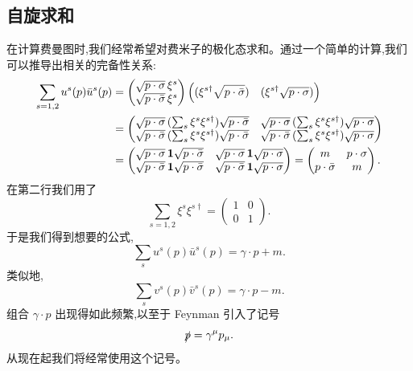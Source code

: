 \subsection{自旋求和}

在计算费曼图时,我们经常希望对费米子的极化态求和。通过一个简单的计算,我们可以推导出相关的完备性关系:
\begin{align}
  \sum_{s=1,2} u^s(p)\bar{u}^s(p) &=
    \begin{pmatrix}
      \sqrt{p\cdot\sigma}\,\xi^s\\
      \sqrt{p\cdot\bar{\sigma}}\,\xi^s
    \end{pmatrix}
    \Bigl( (\xi^{s\dagger}\sqrt{p\cdot\bar{\sigma}})
      \quad (\xi^{s\dagger}\sqrt{p\cdot\sigma}) \Bigr)\\
  &= \begin{pmatrix}
      \sqrt{p\cdot\sigma}\,(\sum_s \xi^s\xi^{s\dagger})\sqrt{p\cdot\bar{\sigma}}
        & \sqrt{p\cdot\sigma}\,(\sum_s \xi^s\xi^{s\dagger})\sqrt{p\cdot\sigma}\\
      \sqrt{p\cdot\bar{\sigma}}\,(\sum_s \xi^s\xi^{s\dagger})
        \sqrt{p\cdot\bar{\sigma}}
        & \sqrt{p\cdot\bar{\sigma}}\,(\sum_s \xi^s\xi^{s\dagger})
          \sqrt{p\cdot\sigma}
    \end{pmatrix}\\
  &= \begin{pmatrix}
      \sqrt{p\cdot\sigma}\,\mathbf{1}\sqrt{p\cdot\bar{\sigma}}
        & \sqrt{p\cdot\sigma}\,\mathbf{1}\sqrt{p\cdot\sigma}\\
      \sqrt{p\cdot\bar{\sigma}}\,\mathbf{1}\sqrt{p\cdot\bar{\sigma}}
        & \sqrt{p\cdot\bar{\sigma}}\,\mathbf{1}\sqrt{p\cdot\sigma}
    \end{pmatrix}
  = \begin{pmatrix}
      m & p\cdot\sigma\\
      p\cdot\bar{\sigma} & m
    \end{pmatrix}.
  \label{eq:3.68}
\end{align}
在第二行我们用了
\begin{equation}
  \sum_{s=1,2}\xi^s\xi^{s\dagger} = \begin{pmatrix}1&0\\0&1\end{pmatrix}.
\end{equation}
于是我们得到想要的公式,
\begin{equation}
  \sum_{s} u^s(p)\bar{u}^s(p) = \gamma\cdot p + m .
  \label{eq:3.69}
\end{equation}
类似地,
\begin{equation}
  \sum_{s} v^s(p)\bar{v}^s(p) = \gamma\cdot p - m .
  \label{eq:3.70}
\end{equation}
组合 $\gamma\cdot p$ 出现得如此频繁,以至于 Feynman 引入了记号
\begin{equation}
  \slashed{p} = \gamma^\mu p_\mu .
  \label{eq:3.71}
\end{equation}
从现在起我们将经常使用这个记号。


